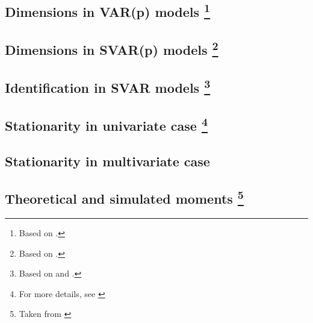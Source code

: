 \documentclass[11pt]{article}
\newcommand*{\varp}[1][p]{VAR(#1)}
\newcommand*{\svar}{SVAR}
\newcommand*{\svarp}[1][p]{SVAR(#1)}
\begin{document}
\subsection{Dimensions in \texorpdfstring{\varp{}}{VAR} models\texorpdfstring{%
        \protect\footnote{Based on \cite[][see the section 17, titled ``Dimensions and VAR(1) representation'']{Mutschler-2018-github_repo}.}%
    }{}
}


\subsection{Dimensions in \texorpdfstring{\svarp{}}{SVAR} models\texorpdfstring{%
        \protect\footnote{Based on \cite[][see the section 17, titled ``Dimensions and VAR(1) representation'']{Mutschler-2018-github_repo}.}%
    }{}}


\subsection{Identification in \texorpdfstring{\svar{}}{SVAR} models\texorpdfstring{%
        \protect\footnote{Based on \cite[][see pages 332-334]{Hamilton-1994} and \cite[][see chapter 14]{MartinHurnHarris-2012}.}%
    }{}}


\subsection{Stationarity in univariate case\texorpdfstring{%
        \protect\footnote{For more details, see \cite[][see Chapter 3, Stationary ARMA processes]{Hamilton-1994}}%
    }{}}


\subsection{Stationarity in multivariate case}


\subsection{Theoretical and simulated moments\texorpdfstring{%
        \protect\footnote{Taken from \cite[][see Sectiona 18, "Theoretical and simulated moments]{Mutschler-2018-github_repo}}%
    }{}}

\end{document}
